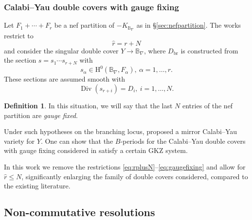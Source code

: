 \documentclass[12pt,a4paper,oneside]{amsart}
\numberwithin{equation}{section}
\theoremstyle{definition}
\newtheorem{defin}[thm]{Definition}
\theoremstyle{remark}
\DeclareMathOperator{\Div}{Div}
\newcommand{\cB}{\mathbb{B}}
\begin{document}
\subsubsection{Calabi--Yau double covers with gauge fixing}
\label{sec:LLY}
Let $F_1 + \cdots + F_{r}$ be a nef partition of $-K_{\cB_{\nabla}}$ as in 
\S\ref{sec:nefpartition}. The works \cite{Hosono:2018kqt,Hosono:2019jet,Hosono:2020gpj,Lee:2020oyt} restrict to 
\begin{equation}
\label{eq:rplusN}
    \hat{r}=r+N
\end{equation}
and consider the singular double cover $Y \longrightarrow \cB_{\nabla} $, where $D_{\mathrm{br}}$ is constructed from the section $s=s_1 \cdots s_{r+N}$ with 
\begin{equation}
\label{eq:branchingsec}
	s_{\alpha} \in \mathrm{H}^{0} (\cB_{\nabla} , F_{\alpha}),~\alpha=1,\ldots,r.
\end{equation}
These sections are assumed smooth with 
\begin{equation}
\label{eq:gaugefixing}
	\Div \left( s_{r + i} \right) = D_i,~i=1, \ldots, N.
\end{equation}
\begin{defin}
    In this situation, we will say that the last $N$ entries of the nef partition are \emph{gauge fixed}.
\end{defin}
\par
Under such hypotheses on the branching locus, \cite{Hosono:2020gpj,Lee:2020oyt} 
proposed a mirror Calabi--Yau variety for $Y$.
One can show that the \(B\)-periods for the Calabi--Yau double covers with 
gauge fixing considered
in \cite{Lee:2020oyt} satisfy a certain GKZ system.

In this work we remove the restrictions \eqref{eq:rplusN}--\eqref{eq:gaugefixing} and allow for $\hat{r} \le N$, significantly enlarging the family of double covers considered, compared to the existing literature.




\subsection{Non-commutative resolutions}
\label{sec:NCmath}
\end{document}
